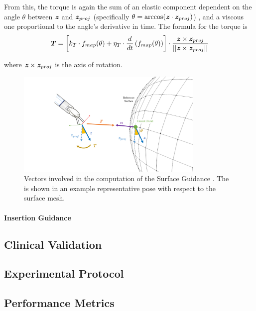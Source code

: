 \documentclass[../main.tex]{subfiles}
\begin{document}
From this, the torque is again the sum of an elastic component dependent on the angle $\theta$ between $\textbf{\textit{z}}$ and $\textbf{\textit{z}}_{proj}$ (specifically $\theta = \arccos(\textbf{\textit{z}}\cdot\textbf{\textit{z}}_{proj})$) , and a viscous one proportional to the angle's derivative in time. The formula for the torque is
\begin{equation}
    \textbf{\textit{T}} = \left[k_T\cdot f_{map}(\theta) + \eta_T\cdot \frac{d}{dt} \left( f_{map}(\theta)\right)\right]\cdot \frac{\textbf{\textit{z}} \times \textbf{\textit{z}}_{proj}}{||\textbf{\textit{z}} \times \textbf{\textit{z}}_{proj}||}
    \label{eq:}
\end{equation}

where $\textbf{\textit{z}} \times \textbf{\textit{z}}_{proj}$ is the axis of rotation.

\begin{figure}
    \centering
    \includegraphics[width=0.8\textwidth]{images/surface_guidance.png}
    \caption{Vectors involved in the computation of the Surface Guidance \vf. The \psm is shown in an example representative pose with respect to the surface mesh.}
    \label{fig:surfaceguidance}
\end{figure}


\paragraph{Insertion Guidance}


\subsection{Clinical Validation}
\subsection{Experimental Protocol}
\subsection{Performance Metrics}




\end{document}
